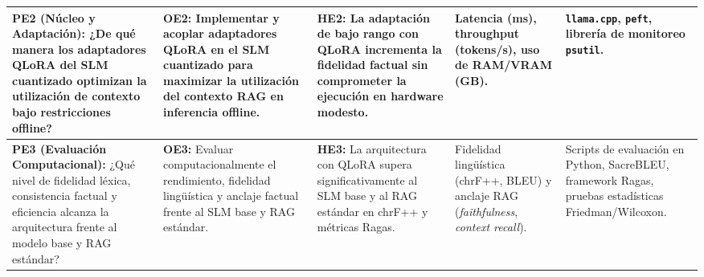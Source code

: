 \begin{table}[H]
\begin{tabularx}{\textwidth}{@{}p{2.8cm}p{3.0cm}p{3.0cm}p{2.4cm}X@{}}
\midrule
\textbf{PE2 (Núcleo y Adaptación):} ¿De qué manera los adaptadores QLoRA del SLM cuantizado optimizan la utilización de contexto bajo restricciones offline? & 
\textbf{OE2:} Implementar y acoplar adaptadores QLoRA en el SLM cuantizado para maximizar la utilización del contexto RAG en inferencia offline. & 
\textbf{HE2:} La adaptación de bajo rango con QLoRA incrementa la fidelidad factual sin comprometer la ejecución en hardware modesto. & 
Latencia (ms), throughput (tokens/s), uso de RAM/VRAM (GB). & 
\texttt{llama.cpp}, \texttt{peft}, librería de monitoreo \texttt{psutil}. \\
\midrule
\textbf{PE3 (Evaluación Computacional):} ¿Qué nivel de fidelidad léxica, consistencia factual y eficiencia alcanza la arquitectura frente al modelo base y RAG estándar? & 
\textbf{OE3:} Evaluar computacionalmente el rendimiento, fidelidad lingüística y anclaje factual frente al SLM base y RAG estándar. & 
\textbf{HE3:} La arquitectura con QLoRA supera significativamente al SLM base y al RAG estándar en chrF++ y métricas Ragas. & 
Fidelidad lingüística (chrF++, BLEU) y anclaje RAG (\textit{faithfulness}, \textit{context recall}). & 
Scripts de evaluación en Python, SacreBLEU, framework Ragas, pruebas estadísticas Friedman/Wilcoxon. \\
\bottomrule
\end{tabularx}
\end{table}
